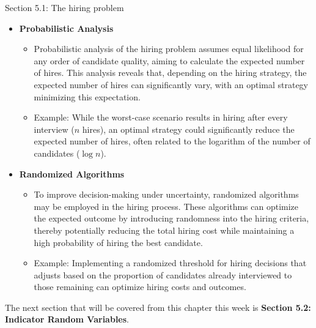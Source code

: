 \begin{notes}{Section 5.1: The hiring problem}
\begin{itemize}
        \item \textbf{Probabilistic Analysis}
        \begin{itemize}
            \item Probabilistic analysis of the hiring problem assumes equal likelihood for any order of candidate quality, aiming to calculate the expected number of hires. This analysis reveals 
            that, depending on the hiring strategy, the expected number of hires can significantly vary, with an optimal strategy minimizing this expectation.
            \item Example: While the worst-case scenario results in hiring after every interview ($n$ hires), an optimal strategy could significantly reduce the expected number of hires, often 
            related to the logarithm of the number of candidates ($\log n$).
        \end{itemize}
        
        \item \textbf{Randomized Algorithms}
        \begin{itemize}
            \item To improve decision-making under uncertainty, randomized algorithms may be employed in the hiring process. These algorithms can optimize the expected outcome by introducing randomness 
            into the hiring criteria, thereby potentially reducing the total hiring cost while maintaining a high probability of hiring the best candidate.
            \item Example: Implementing a randomized threshold for hiring decisions that adjusts based on the proportion of candidates already interviewed to those remaining can optimize hiring costs 
            and outcomes.
        \end{itemize}
    \end{itemize}
\end{notes}

The next section that will be covered from this chapter this week is \textbf{Section 5.2: Indicator Random Variables}.


